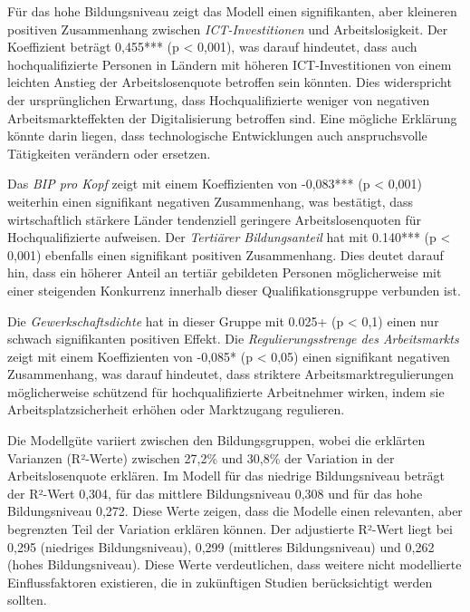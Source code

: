 Für das hohe Bildungsniveau zeigt das Modell einen signifikanten, aber kleineren positiven
Zusammenhang zwischen \textit{\ac{ICT}-Investitionen} und Arbeitslosigkeit. Der Koeffizient beträgt
0,455*** (p < 0,001), was darauf hindeutet, dass auch hochqualifizierte Personen in Ländern mit
höheren \ac{ICT}-Investitionen von einem leichten Anstieg der Arbeitslosenquote betroffen sein
könnten. Dies widerspricht der ursprünglichen Erwartung, dass Hochqualifizierte weniger
von negativen Arbeitsmarkteffekten der Digitalisierung betroffen sind. Eine mögliche Erklärung
könnte darin liegen, dass technologische Entwicklungen auch anspruchsvolle Tätigkeiten
verändern oder ersetzen.

Das \textit{\ac{BIP} pro Kopf} zeigt mit einem Koeffizienten von -0,083*** (p < 0,001)
weiterhin einen signifikant negativen Zusammenhang, was bestätigt, dass wirtschaftlich stärkere
Länder tendenziell geringere Arbeitslosenquoten für Hochqualifizierte aufweisen. Der
\textit{Tertiärer Bildungsanteil} hat mit 0.140*** (p < 0,001) ebenfalls einen signifikant positiven
Zusammenhang. Dies deutet darauf hin, dass ein höherer Anteil an tertiär gebildeten Personen
möglicherweise mit einer steigenden Konkurrenz innerhalb dieser Qualifikationsgruppe verbunden ist.

Die \textit{Gewerkschaftsdichte} hat in dieser Gruppe mit 0.025+ (p < 0,1) einen nur schwach
signifikanten positiven Effekt. Die \textit{Regulierungsstrenge des Arbeitsmarkts} zeigt mit einem
Koeffizienten von -0,085* (p < 0,05) einen signifikant negativen Zusammenhang, was darauf hindeutet,
dass striktere Arbeitsmarktregulierungen möglicherweise schützend für hochqualifizierte Arbeitnehmer
wirken, indem sie Arbeitsplatzsicherheit erhöhen oder Marktzugang regulieren.

Die Modellgüte variiert zwischen den Bildungsgruppen, wobei die erklärten Varianzen (R²-Werte)
zwischen 27,2\% und 30,8\% der Variation in der Arbeitslosenquote erklären. Im Modell für das
niedrige Bildungsniveau beträgt der R²-Wert 0,304, für das mittlere Bildungsniveau 0,308 und für das hohe
Bildungsniveau 0,272. Diese Werte zeigen, dass die Modelle einen relevanten, aber begrenzten Teil der
Variation erklären können. Der adjustierte R²-Wert liegt bei 0,295 (niedriges Bildungsniveau), 0,299
(mittleres Bildungsniveau) und 0,262 (hohes Bildungsniveau). Diese Werte verdeutlichen, dass weitere
nicht modellierte Einflussfaktoren existieren, die in zukünftigen Studien berücksichtigt werden sollten.

